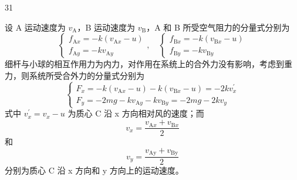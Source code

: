 \begin{solution}{31}
  \begin{subsolution}
    设 A 运动速度为 $v_{\mathrm{A}}$，B 运动速度为 $v_{\mathrm{B}}$，A 和 B 所受空气阻力的分量式分别为
    \begin{equation}
      \left\{
        \begin{array}{l}
          f_{\mathrm{A} x} = - k (v_{\mathrm{A} x} - u) \\
          f_{\mathrm{A} y} = - k v_{\mathrm{A} y}
        \end{array}
      , \quad
      \left\{
        \begin{array}{l}
          f_{\mathrm{B} x} = - k (v_{\mathrm{B} x} - u) \\
          f_{\mathrm{B} y} = - k v_{\mathrm{B} y}
        \end{array}
      \right. \right.
    \end{equation}
    细杆与小球的相互作用力为内力，对作用在系统上的合外力没有影响，考虑到重力，则系统所受合外力的分量式分别为
    \begin{equation}
      \left\{
        \begin{array}{l}
          F_{x} = - k (v_{\mathrm{A} x} - u) - k (v_{\mathrm{B} x} - u) = - 2 k v_{x}^{\prime} \\
          F_{y} = - 2 m g - k v_{\mathrm{A} y} - k v_{\mathrm{B} y} = - 2 m g - 2 k v_{y}
        \end{array}
      \right.
      \label{eq:1.p31}
    \end{equation}
    式中 $v_{x}^{\prime}=v_{x}-u$ 为质心 C 沿 x 方向相对风的速度；而
    \begin{equation}
      v_{x} = \frac{v_{\mathrm{A} x} + v_{\mathrm{B} x}}{2}
    \end{equation}
    和
    \begin{equation}
      v_{y} = \frac{v_{\mathrm{Ay}} + v_{\mathrm{By}}}{2}
    \end{equation}
    分别为质心 C 沿 x 方向和 y 方向上的运动速度。


\end{subsolution}
\end{solution}
